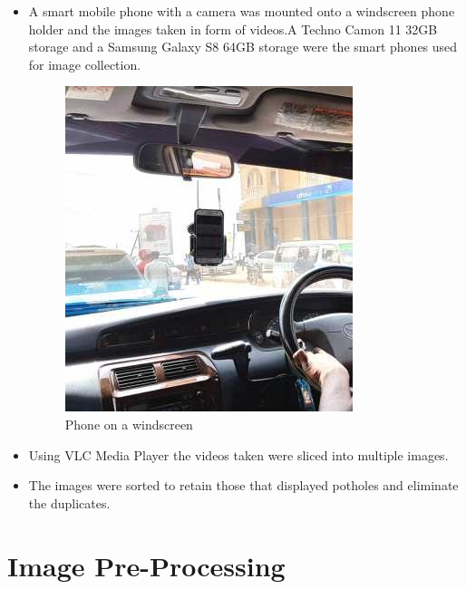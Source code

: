 \documentclass[12pt]{report}
\begin{document}
\begin{itemize}[topsep=0pt]
 
\item A smart mobile phone with a camera was mounted onto a windscreen phone holder and the images taken in form of videos.A Techno Camon 11 32GB storage and a Samsung Galaxy S8 64GB storage were the smart phones used for image collection.

\begin{figure}[H]\includegraphics[scale=0.6]{phone.jpg}\centering\caption{Phone on a windscreen} \label{fig:Phone on windscreen} \end{figure}%

\item  Using VLC Media Player the videos taken were sliced into multiple images.

\item  The images were sorted to retain those that displayed potholes and eliminate the duplicates.
\end{itemize}

\section{Image Pre-Processing}
\end{document}
